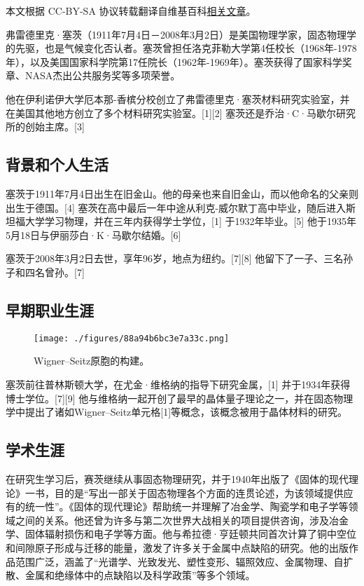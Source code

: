 
本文根据 CC-BY-SA 协议转载翻译自维基百科\href{https://en.wikipedia.org/wiki/Frederick_Seitz}{相关文章}。

弗雷德里克·塞茨（1911年7月4日－2008年3月2日）是美国物理学家，固态物理学的先驱，也是气候变化否认者。塞茨曾担任洛克菲勒大学第4任校长（1968年-1978年），以及美国国家科学院第17任院长（1962年-1969年）。塞茨获得了国家科学奖章、NASA杰出公共服务奖等多项荣誉。

他在伊利诺伊大学厄本那-香槟分校创立了弗雷德里克·塞茨材料研究实验室，并在美国其他地方创立了多个材料研究实验室。[1][2] 塞茨还是乔治·C·马歇尔研究所的创始主席。[3]
\subsection{背景和个人生活} 
塞茨于1911年7月4日出生在旧金山。他的母亲也来自旧金山，而以他命名的父亲则出生于德国。[4] 塞茨在高中最后一年中途从利克-威尔默丁高中毕业，随后进入斯坦福大学学习物理，并在三年内获得学士学位，[1] 于1932年毕业。[5] 他于1935年5月18日与伊丽莎白·K·马歇尔结婚。[6]

塞茨于2008年3月2日去世，享年96岁，地点为纽约。[7][8] 他留下了一子、三名孙子和四名曾孙。[7]
\subsection{早期职业生涯}
\begin{figure}[ht]
\centering
\texttt{[image: ./figures/88a94b6bc3e7a33c.png]}
\caption{Wigner–Seitz原胞的构建。} \label{fig_Seitz_1}
\end{figure}
塞茨前往普林斯顿大学，在尤金·维格纳的指导下研究金属，[1] 并于1934年获得博士学位。[7][9] 他与维格纳一起开创了最早的晶体量子理论之一，并在固态物理学中提出了诸如Wigner–Seitz单元格[1]等概念，该概念被用于晶体材料的研究。
\subsection{学术生涯}  
在研究生学习后，赛茨继续从事固态物理研究，并于1940年出版了《固体的现代理论》一书，目的是“写出一部关于固态物理各个方面的连贯论述，为该领域提供应有的统一性”。《固体的现代理论》帮助统一并理解了冶金学、陶瓷学和电子学等领域之间的关系。他还曾为许多与第二次世界大战相关的项目提供咨询，涉及冶金学、固体辐射损伤和电子学等方面。他与希拉德·亨廷顿共同首次计算了铜中空位和间隙原子形成与迁移的能量，激发了许多关于金属中点缺陷的研究。他的出版作品范围广泛，涵盖了“光谱学、光致发光、塑性变形、辐照效应、金属物理、自扩散、金属和绝缘体中的点缺陷以及科学政策”等多个领域。
